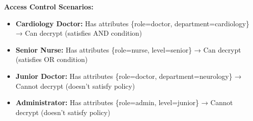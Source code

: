 \documentclass[11pt,a4paper]{article}
\begin{document}
\begin{examplebox}
\textbf{Access Control Scenarios:}
\begin{itemize}
    \item \textbf{Cardiology Doctor:} Has attributes \{role=doctor, department=cardiology\} → Can decrypt (satisfies AND condition)
    \item \textbf{Senior Nurse:} Has attributes \{role=nurse, level=senior\} → Can decrypt (satisfies OR condition)
    \item \textbf{Junior Doctor:} Has attributes \{role=doctor, department=neurology\} → Cannot decrypt (doesn't satisfy policy)
    \item \textbf{Administrator:} Has attributes \{role=admin, level=junior\} → Cannot decrypt (doesn't satisfy policy)
\end{itemize}
\end{examplebox}
\end{document}
